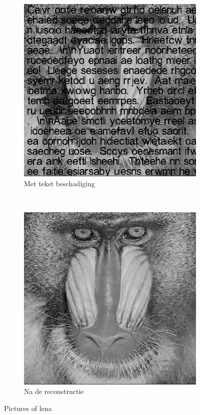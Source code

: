 \begin{figure}
    \centering
    \begin{subfigure}[b]{0.45\textwidth}
        \includegraphics[width=\textwidth]{../src/inpainting/baboon_broke}
        \caption{Met tekst beschadiging}
        \label{fig:tiger}
    \end{subfigure}
    ~ %
    \begin{subfigure}[b]{0.45\textwidth}
        \includegraphics[width=\textwidth]{../src/inpainting/baboon_fixed}
        \caption{Na de reconstructie}
        \label{fig:mouse}
    \end{subfigure}
    \caption{Pictures of lena}\label{fig:baboon}
\end{figure}



